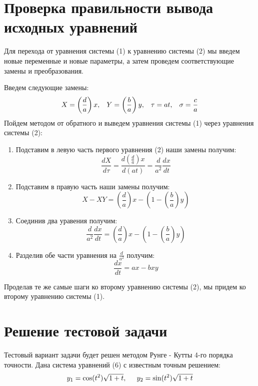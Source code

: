 \documentclass[a4paper,12pt]{article}
\begin{document}
\section{Проверка правильности вывода исходных уравнений}
\hspace{0.5cm} Для перехода от уравнения системы (1) к уравнению системы (2) мы введем новые переменные и новые параметры,
а затем проведем соответствующие замены и преобразования.

Введем следующие замены: 
\begin{equation}
    X = \left(\frac{d}{a}\right)x, \hspace{0.3cm} Y = \left(\frac{b}{a}\right)y, \hspace{0.3cm} \tau = at, \hspace{0.3cm} \sigma = \frac{c}{a}
\end{equation}
\hspace{0.5cm} Пойдем методом от обратного и выведем уравнения системы (1) через уравнения системы (2):
\begin{enumerate}
    \item Подставим в левую часть первого уравнения (2) наши замены получим:
    \[ \frac{dX}{d\tau} = \frac{d\left(\frac{d}{a}\right)x}{d(at)} = \frac{d}{a^2} \frac{dx}{dt} \]
    \item Подставим в правую часть наши замены получим: 
    \[ X - XY = \left(\frac{d}{a}\right)x - \left(1 - \left(\frac{b}{a}\right)y\right) \]
    \item Соединив два уравения получим:
    \[ \frac{d}{a^2} \frac{dx}{dt} = \left(\frac{d}{a}\right)x - \left(1 - \left(\frac{b}{a}\right)y\right) \]
    \item Разделив обе части уравнения на $\frac{d}{a^2}$ получим:
    \[ \frac{dx}{dt} = ax - bxy \]
\end{enumerate}

Проделав те же самые шаги ко второму уравнению системы (2), мы придем ко второму уравнению системы (1).

\newpage
\section{Решение тестовой задачи}
\hspace{0.5cm} Тестовый вариант задачи будет решен методом Рунге - Кутты 4-го порядка точности.
Дана система уравнений (6) с известным точным решением:
\begin{equation}
    y_1 = \cos(t^2)\sqrt{1 + t}, \hspace{0.5cm} y_2 = \sin(t^2)\sqrt{1 + t}
\end{equation}
\end{document}
